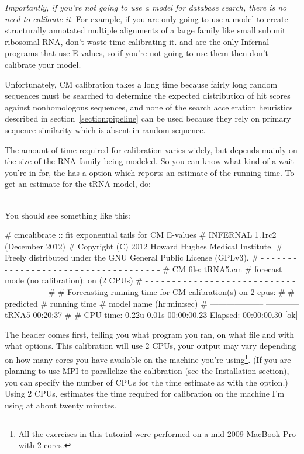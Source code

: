 \emph{Importantly, if you're not going to use a model for database
search, there is no need to calibrate it.} For example, if you are
only going to use a model to create structurally annotated multiple
alignments of a large family like small subunit ribosomal RNA, don't
waste time calibrating it.  and  are the
only Infernal programs that use E-values, so if you're not going to
use them then don't calibrate your model.

Unfortunately, CM calibration takes a long time because fairly long
random sequences must be searched to determine the expected
distribution of hit scores against nonhomologous sequences, and none
of the search acceleration heuristics described in
section~\ref{section:pipeline} can be used because they rely on
primary sequence similarity which is absent in random sequence.

The amount of time required for calibration varies widely, but
depends mainly on the size of the RNA family being modeled.
So you can know what kind of a wait you're in for, the
 has a  option which reports an
estimate of the running time. To get an estimate for the tRNA model, do:

\\

You should see something like this:

\begin{sreoutput}
# cmcalibrate :: fit exponential tails for CM E-values
# INFERNAL 1.1rc2 (December 2012)
# Copyright (C) 2012 Howard Hughes Medical Institute.
# Freely distributed under the GNU General Public License (GPLv3).
# - - - - - - - - - - - - - - - - - - - - - - - - - - - - - - - - - - - -
# CM file:                                     tRNA5.cm
# forecast mode (no calibration):              on (2 CPUs)
# - - - - - - - - - - - - - - - - - - - - - - - - - - - - - - - - - - - -
#
# Forecasting running time for CM calibration(s) on 2 cpus:
#
#                          predicted
#                       running time
# model name            (hr:min:sec)
# --------------------  ------------
  tRNA5                     00:20:37
#
# CPU time: 0.22u 0.01s 00:00:00.23 Elapsed: 00:00:00.30
[ok]
\end{sreoutput}

The header comes first, telling you what program you ran, on what file
and with what options. This calibration will use 2 CPUs, your output
may vary depending on how many cores you have available on the machine
you're using\footnote{All the exercises in this tutorial were
  performed on a mid 2009 MacBook Pro with 2 cores.}. (If you are
planning to use MPI to parallelize the calibration (see the
Installation section), you can specify the number of CPUs for the time
estimate as  with the  option.) Using
2 CPUs,  estimates the time required for calibration
on the machine I'm using at about twenty minutes.

